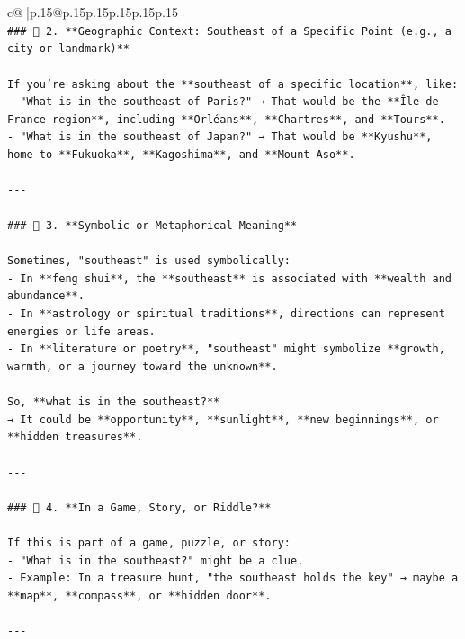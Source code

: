 \documentclass{article}
\begin{document}
{\begin{supertabular}{c@{$\;$}|p{.15\linewidth}@{}p{.15\linewidth}p{.15\linewidth}p{.15\linewidth}p{.15\linewidth}p{.15\linewidth}}
{{{\\ 
\texttt{\#\#\# 🔹 2. **Geographic Context: Southeast of a Specific Point (e.g., a city or landmark)**} \\
\\ 
\texttt{If you're asking about the **southeast of a specific location**, like:} \\
\texttt{{-} "What is in the southeast of Paris?" → That would be the **Île{-}de{-}France region**, including **Orléans**, **Chartres**, and **Tours**.} \\
\texttt{{-} "What is in the southeast of Japan?" → That would be **Kyushu**, home to **Fukuoka**, **Kagoshima**, and **Mount Aso**.} \\
\\ 
\texttt{{-}{-}{-}} \\
\\ 
\texttt{\#\#\# 🔹 3. **Symbolic or Metaphorical Meaning**} \\
\\ 
\texttt{Sometimes, "southeast" is used symbolically:} \\
\texttt{{-} In **feng shui**, the **southeast** is associated with **wealth and abundance**.} \\
\texttt{{-} In **astrology or spiritual traditions**, directions can represent energies or life areas.} \\
\texttt{{-} In **literature or poetry**, "southeast" might symbolize **growth, warmth, or a journey toward the unknown**.} \\
\\ 
\texttt{So, **what is in the southeast?**  } \\
\texttt{→ It could be **opportunity**, **sunlight**, **new beginnings**, or **hidden treasures**.} \\
\\ 
\texttt{{-}{-}{-}} \\
\\ 
\texttt{\#\#\# 🔹 4. **In a Game, Story, or Riddle?**} \\
\\ 
\texttt{If this is part of a game, puzzle, or story:} \\
\texttt{{-} "What is in the southeast?" might be a clue.} \\
\texttt{{-} Example: In a treasure hunt, "the southeast holds the key" → maybe a **map**, **compass**, or **hidden door**.} \\
\\ 
\texttt{{-}{-}{-}} \\
}}}
\end{supertabular}}
\end{document}
